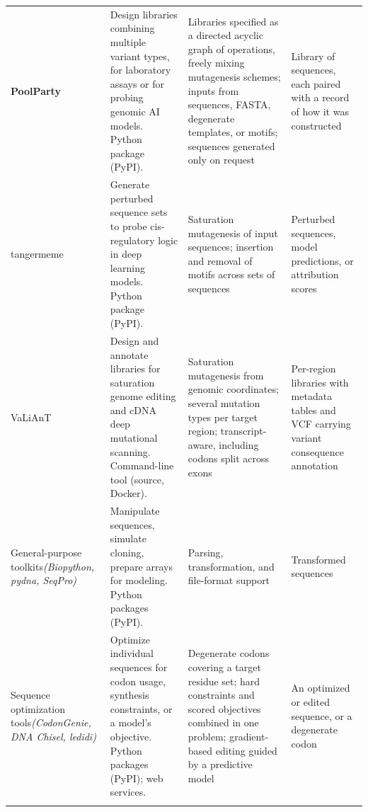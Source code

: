 \begin{table}[tbp]
\begin{tabular}{@{}>{\raggedright\arraybackslash}p{2.0cm}>{\raggedright\arraybackslash}p{3.4cm}>{\raggedright\arraybackslash}p{4.3cm}>{\raggedright\arraybackslash}p{2.15cm}@{}}
\textbf{PoolParty} &
Design libraries combining multiple variant types, for laboratory assays
or for probing genomic AI models. Python package (PyPI). &
Libraries specified as a directed acyclic graph of operations, freely
mixing mutagenesis schemes; inputs from sequences, FASTA, degenerate
templates, or motifs; sequences generated only on request &
Library of sequences, each paired with a record of how it was constructed\\
\addlinespace

tangermeme \citep{Schreiber2025nd} &
Generate perturbed sequence sets to probe cis-regulatory logic in deep
learning models. Python package (PyPI). &
Saturation mutagenesis of input sequences; insertion and removal of motifs
across sets of sequences &
Perturbed sequences, model predictions, or attribution scores\\
\addlinespace

VaLiAnT \citep{Barbon2022th} &
Design and annotate libraries for saturation genome editing and cDNA deep
mutational scanning. Command-line tool (source, Docker). &
Saturation mutagenesis from genomic coordinates; several mutation types
per target region; transcript-aware, including codons split across exons &
Per-region libraries with metadata tables and VCF carrying variant
consequence annotation\\
\midrule

General-purpose toolkits\newline\textit{(Biopython, pydna, SeqPro)} \citep{Cock2009df,Pereira2015wj,Klie2023kg} &
Manipulate sequences, simulate cloning, prepare arrays for modeling.
Python packages (PyPI). &
Parsing, transformation, and file-format support &
Transformed sequences\\
\addlinespace

Sequence optimization tools\newline\textit{(CodonGenie, DNA Chisel, ledidi)} \citep{Swainston2017rb,Zulkower2020jk,Schreiber2025ledidi} &
Optimize individual sequences for codon usage, synthesis constraints, or a
model's objective. Python packages (PyPI); web services. &
Degenerate codons covering a target residue set; hard constraints and
scored objectives combined in one problem; gradient-based editing guided
by a predictive model &
An optimized or edited sequence, or a degenerate codon\\
\botrule
\end{tabular}
\end{table}
